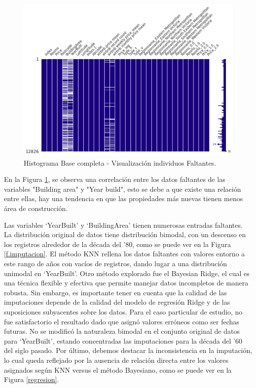 \begin{figure} [!ht]
\begin{center}
\includegraphics[width=1.0\columnwidth]{img/datosfaltantes2.png}
\caption{Histograma Base completa - Visualización individuos Faltantes.}
\label{faltantes2}
\end{center}
\end{figure}

En la Figura \ref{faltantes2}, se observa una correlación entre los datos faltantes de las variables "Building area" y "Year build", esto se debe a que existe una relación entre ellas,  hay una tendencia en que las propiedades más nuevas tienen menos área de construcción.


Las variables `YearBuilt' y `BuildingArea' tienen numerosas entradas faltantes. La distribución original de datos tiene distribución bimodal, con un descenso en los registros alrededor de la década del '80, como se puede ver en la Figura \ref{f.imputacion}. El método KNN rellena los datos faltantes con valores entorno a este rango de años con vacíos de registros, dando lugar a una distribución unimodal en `YearBuilt'. 
Otro método explorado fue el Bayesian Ridge, el cual es una técnica flexible y efectiva que permite manejar datos incompletos de manera robusta. Sin embargo, es importante tener en cuenta que la calidad de las imputaciones depende de la calidad del modelo de regresión Ridge y de las suposiciones subyacentes sobre los datos. Para el caso particular de estudio, no fue satisfactorio el resultado dado que asignó valores erróneos como ser fechas futuras. No se modificó la naturaleza bimodal en el conjunto original de datos para `YearBuilt', estando concentradas las imputaciones para la década del '60 del siglo pasado. Por último, debemos destacar la inconsistencia en la imputación, lo cual queda reflejado por la ausencia de relación directa entre los valores asignados según KNN versus el método Bayesiano, como se puede ver en la Figura \ref{regresion}.

